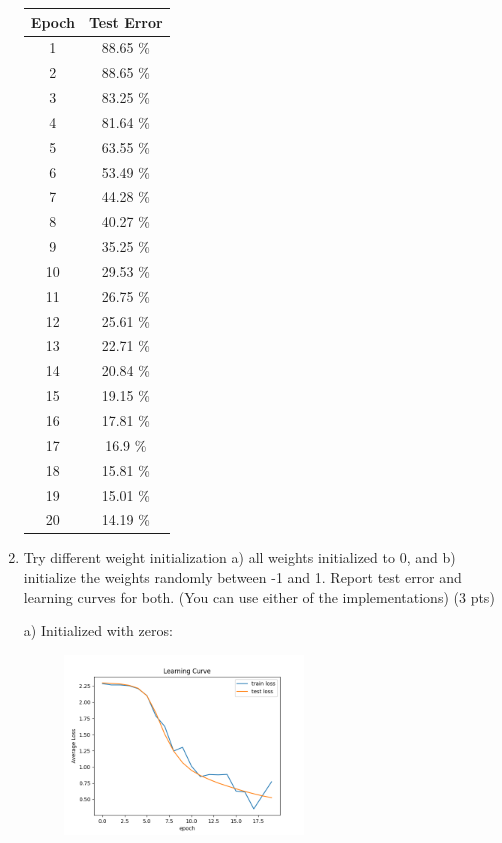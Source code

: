 \documentclass[a4paper]{article}
\theoremstyle{definition}
\newenvironment{soln}{
    \leavevmode\color{blue}\ignorespaces
}{}
\begin{document}
\begin{enumerate}
\begin{soln}
        \begin{center}
            \begin{tabular}{c | c}
                Epoch & Test Error \\ \hline
                1 & 88.65 \% \\
                2 & 88.65 \% \\
                3 & 83.25 \% \\
                4 & 81.64 \% \\
                5 & 63.55 \% \\
                6 & 53.49 \% \\
                7 & 44.28 \% \\
                8 & 40.27 \% \\
                9 & 35.25 \% \\
                10 & 29.53 \% \\
                11 & 26.75 \% \\
                12 & 25.61 \% \\
                13 & 22.71 \% \\
                14 & 20.84 \% \\
                15 & 19.15 \% \\
                16 & 17.81 \% \\
                17 & 16.9 \% \\
                18 & 15.81 \% \\
                19 & 15.01 \% \\
                20 & 14.19 \% \\
            \end{tabular}
        \end{center}
    \end{soln}

    \item Try different weight initialization a) all weights initialized to 0, and b) initialize the weights randomly between -1 and 1. Report test error and learning curves for both. (You can use either of the implementations) (3 pts)
    
    \begin{soln}

        a) Initialized with zeros:

        \begin{figure}[H]
			\centering
			\includegraphics[width=0.6\textwidth]{../figs/init_zeros_learning_curve.png}
		\end{figure}
       

\end{soln}
\end{enumerate}
\end{document}
